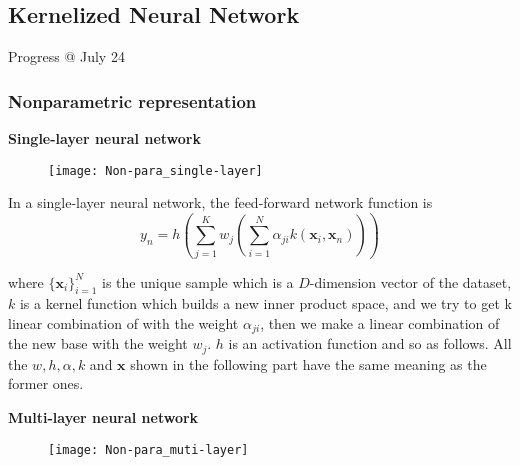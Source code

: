 \documentclass{article}
\begin{document}
\subsection{Kernelized Neural Network}

\newpage
\par\par\LARGE Progress @ July 24\normalsize

\subsubsection{Nonparametric representation}


\par \textbf{Single-layer neural network}\\

\begin{figure}[h]
\centering
\texttt{[image: Non-para\_single-layer]}
\end{figure}

\par In a single-layer neural network, the feed-forward network function is 
\begin{equation}
y_n = h \left( \sum\limits_{j=1}^{K} w_{j} \left( \sum\limits_{i=1}^{N} \alpha_{ji} k( \mathbf{x}_{i} , \mathbf{x}_{n}) \right)\right)
\end{equation} 

where $ \{ \mathbf{x}_{i}\}_{i=1}^{N}$ is the unique sample which is a $D$-dimension vector of the dataset, $k$ is a kernel function which builds a new inner product space, and we try to get k linear combination of with the weight $\alpha_{ji}$, then we make a linear combination of the new base with the weight $ w_{j}$. $h$ is an activation function and so as follows.  
All the $w, h, \alpha, k$ and $\mathbf{x}$ shown in the following part have the same meaning as the former ones.\\



\par \textbf{Multi-layer neural network} \\

\begin{figure}[h]
\centering
\texttt{[image: Non-para\_muti-layer]}
\end{figure}
\end{document}
